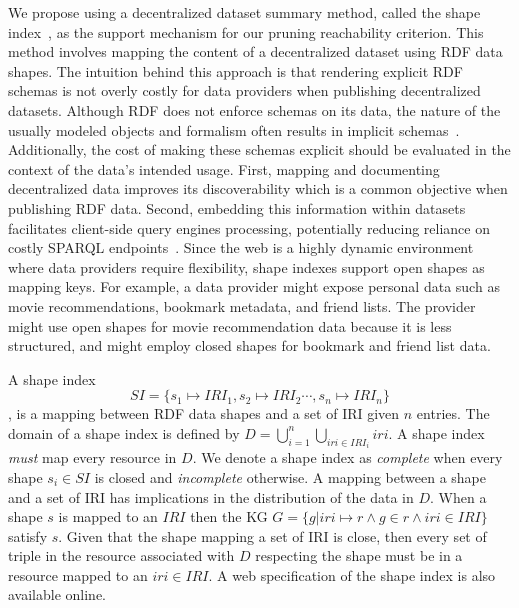 We propose using a decentralized dataset summary method, called the shape index~\cite{tam2024opportunitiesshapebasedoptimizationlink}, as the support mechanism for our pruning reachability criterion.
This method involves mapping the content of a decentralized dataset using RDF data shapes.
The intuition behind this approach is that rendering explicit RDF schemas is not overly costly for data providers when publishing decentralized datasets.
Although RDF does not enforce schemas on its data, the nature of the usually modeled objects and formalism often results in implicit schemas~\cite{Neumann2011CharacteristicSA}.
Additionally, the cost of making these schemas explicit should be evaluated in the context of the data's intended usage.
First, mapping and documenting decentralized data improves its discoverability which is a common objective when publishing RDF data.
Second, embedding this information within datasets facilitates client-side query engines processing, potentially reducing reliance on costly SPARQL endpoints~\cite{aranda2013}.
Since the web is a highly dynamic environment where data providers require flexibility, shape indexes support open shapes as mapping keys.
For example, a data provider might expose personal data such as movie recommendations, bookmark metadata, and friend lists.
The provider might use open shapes for movie recommendation data because it is less structured, and might employ closed shapes for bookmark and friend list data.

A shape index 
\begin{equation}\label{eq:shapeIndex}
   SI = \{s_1 \mapsto IRI_1, s_2 \mapsto IRI_2 \cdots, s_n \mapsto IRI_n\}
\end{equation}
, is a mapping between RDF data shapes and a set of IRI given $n$ entries.
The domain of a shape index is defined by $D = \bigcup\limits_{i=1}^{n} \bigcup_{iri \in IRI_i} iri$.
A shape index \emph{must} map every resource in $D$.
We denote a shape index as \emph{complete} when every shape $s_i \in SI$ is closed and \emph{incomplete} otherwise.
A mapping between a shape and a set of IRI has implications in the distribution of the data in $D$.
When a shape $s$ is mapped to an $IRI$ then the KG $G = \{g | iri \mapsto r \land g \in r \land iri \in IRI\}$ satisfy $s$.
Given that the shape mapping a set of IRI is close, then every set of triple in the resource associated with $D$ respecting the shape must be in a resource mapped to an $iri \in IRI$.
A web specification of the shape index is also available online.~


